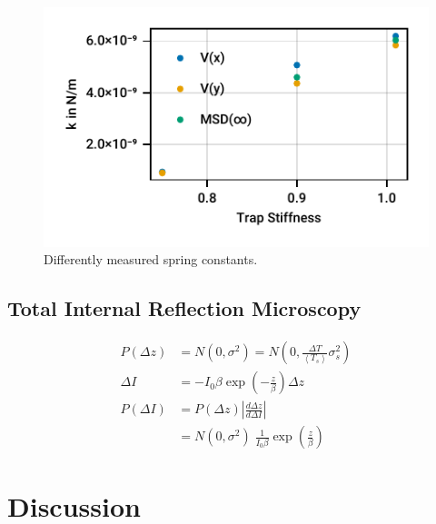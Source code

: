 \documentclass[
    parskip=half, 
    twoside=false,
    twocolumn=true,
    fontsize=11pt,
]{scrarticle}
\begin{document}
\begin{figure}[h]
    \centering
    \includegraphics{figures/01_03_4_spring_constants.pdf}
    \caption{Differently measured spring constants.}
\end{figure}

\subsection{Total Internal Reflection Microscopy}
\begin{align}
    P(\Delta z) &= N(0, \sigma^2) = N\left(0, \frac{\Delta T}{\left<T_s\right>} \sigma_s^2\right)\\
    \Delta I &= - I_0 \beta \exp\left(-\frac{z}{\beta}\right) \Delta z \\
    P(\Delta I) &= P(\Delta z) \left|\frac{d \Delta z}{d \Delta I}\right|\\
    &= N(0, \sigma^2) \;\frac{1}{I_0\beta} \exp\left(\frac{z}{\beta}\right)
\end{align}


\clearpage
\section{Discussion}
\end{document}
